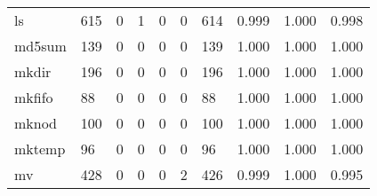 \begin{longtable}{lp{1.3cm}p{1.3cm}p{1.3cm}p{1.3cm}p{1.3cm}p{1.3cm}p{1.3cm}p{1.3cm}p{1.3cm}}
ls        &                    615 &                                             0 &                                            1 &                                           0 &                                            0 &                                        614 &                                0.999 &                                  1.000 &                                0.998 \\
md5sum    &                    139 &                                             0 &                                            0 &                                           0 &                                            0 &                                        139 &                                1.000 &                                  1.000 &                                1.000 \\
mkdir     &                    196 &                                             0 &                                            0 &                                           0 &                                            0 &                                        196 &                                1.000 &                                  1.000 &                                1.000 \\
mkfifo    &                     88 &                                             0 &                                            0 &                                           0 &                                            0 &                                         88 &                                1.000 &                                  1.000 &                                1.000 \\
mknod     &                    100 &                                             0 &                                            0 &                                           0 &                                            0 &                                        100 &                                1.000 &                                  1.000 &                                1.000 \\
mktemp    &                     96 &                                             0 &                                            0 &                                           0 &                                            0 &                                         96 &                                1.000 &                                  1.000 &                                1.000 \\
mv        &                    428 &                                             0 &                                            0 &                                           0 &                                            2 &                                        426 &                                0.999 &                                  1.000 &                                0.995 \\

\end{longtable}
